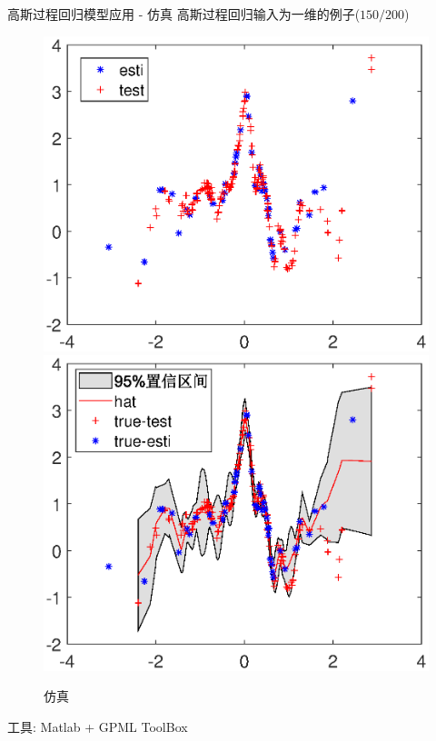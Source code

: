 \begin{frame}{高斯过程回归模型应用 - 仿真}
    高斯过程回归输入为一维的例子($150/200$)
    \vspace{-1ex}
    \begin{figure}[H]
        \centering
        \includegraphics[scale=0.35]{./fig/例子1.eps}
        \includegraphics[scale=0.35]{./fig/例子2.eps}
        \caption{仿真}
    \end{figure}

    工具: Matlab + GPML ToolBox



\end{frame}

